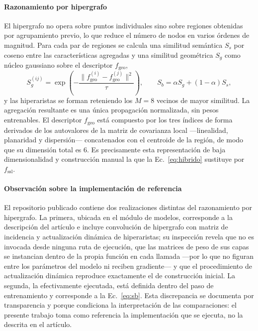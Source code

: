 \paragraph*{Razonamiento por hipergrafo}
El hipergrafo no opera sobre puntos individuales sino sobre regiones obtenidas
por agrupamiento previo, lo que reduce el número de nodos en varios órdenes de
magnitud. Para cada par de regiones se calcula una similitud semántica $S_s$ por
coseno entre las características agregadas y una similitud geométrica $S_g$ como
núcleo gaussiano sobre el descriptor $f_{\mathrm{geo}}$,
\begin{equation}
S_g^{(ij)}=\exp\!\left(-\frac{\lVert f_{\mathrm{geo}}^{(i)}-f_{\mathrm{geo}}^{(j)}\rVert^{2}}{\tau}\right),
\qquad
S_b=\alpha S_g+(1-\alpha)S_s ,
\label{eq:sb}
\end{equation}
y las hiperaristas se forman reteniendo los $M=8$ vecinos de mayor similitud. La
agregación resultante es una única propagación normalizada, sin pesos
entrenables. El descriptor $f_{\mathrm{geo}}$ está compuesto por los tres
índices de forma derivados de los autovalores de la matriz de covarianza local
---linealidad, planaridad y dispersión--- concatenados con el centroide de la
región, de modo que su dimensión total es 6. Es precisamente esta representación
de baja dimensionalidad y construcción manual la que la Ec.~\eqref{eq:hibrido}
sustituye por $f_{\mathrm{ssl}}$.

\paragraph*{Observación sobre la implementación de referencia}
El repositorio publicado contiene dos realizaciones distintas del razonamiento
por hipergrafo. La primera, ubicada en el módulo de modelos, corresponde a la
descripción del artículo e incluye convolución de hipergrafo con matriz de
incidencia y actualización dinámica de hiperaristas; su inspección revela que no
es invocada desde ninguna ruta de ejecución, que las matrices de peso de sus
capas se instancian dentro de la propia función en cada llamada ---por lo que no
figuran entre los parámetros del modelo ni reciben gradiente--- y que el
procedimiento de actualización dinámica reproduce exactamente el de construcción
inicial. La segunda, la efectivamente ejecutada, está definida dentro del paso de
entrenamiento y corresponde a la Ec.~\eqref{eq:sb}. Esta discrepancia se
documenta por transparencia y porque condiciona la interpretación de las
comparaciones: el presente trabajo toma como referencia la implementación que se
ejecuta, no la descrita en el artículo.

